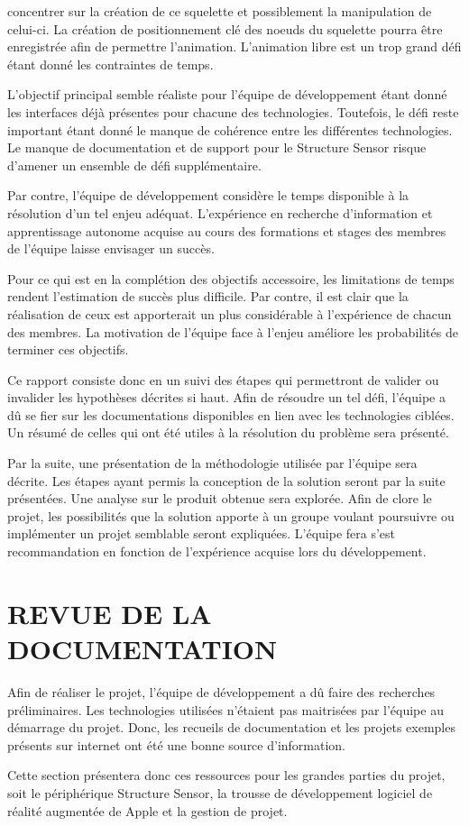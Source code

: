 \documentclass[letterpaper,twoside,12pt,french]{report}
\begin{document}
concentrer sur la création de ce squelette et possiblement la manipulation de celui-ci. La création
de positionnement clé des noeuds du squelette pourra être enregistrée afin de permettre l'animation.
L'animation libre est un trop grand défi étant donné les contraintes de temps.
\par
L'objectif principal semble réaliste pour l'équipe de développement étant donné les interfaces déjà
présentes pour chacune des technologies. Toutefois, le défi reste important étant donné le manque de
cohérence entre les différentes technologies. Le manque de documentation et de support pour le
Structure Sensor risque d'amener un ensemble de défi supplémentaire.
\par
Par contre, l'équipe de développement considère le temps disponible à la résolution d'un tel enjeu
adéquat. L'expérience en recherche d'information et apprentissage autonome acquise au cours des
formations et stages des membres de l'équipe laisse envisager un succès.
\par
Pour ce qui est en la complétion des objectifs accessoire, les limitations de temps rendent
l'estimation de succès plus difficile. Par contre, il est clair que la réalisation de ceux est
apporterait un plus considérable à l'expérience de chacun des membres. La motivation de l'équipe
face à l'enjeu améliore les probabilités de terminer ces objectifs.
\par
Ce rapport consiste donc en un suivi des étapes qui permettront de valider ou invalider les
hypothèses décrites si haut. Afin de résoudre un tel défi, l'équipe a dû se fier sur les
documentations disponibles en lien avec les technologies ciblées. Un résumé de celles qui ont été
utiles à la résolution du problème sera présenté.
\par
Par la suite, une présentation de la méthodologie utilisée par l'équipe sera décrite. Les étapes
ayant permis la conception de la solution seront par la suite présentées. Une analyse sur le produit
obtenue sera explorée. Afin de clore le projet, les possibilités que la solution apporte à un groupe voulant poursuivre ou
implémenter un projet semblable seront expliquées. L'équipe fera s'est recommandation en fonction
de l'expérience acquise lors du développement.
\chapter*{\uppercase{Revue de la documentation}}
Afin de réaliser le projet, l'équipe de développement a dû faire des recherches préliminaires. Les
technologies utilisées n'étaient pas maitrisées par l'équipe au démarrage du projet. Donc, les
recueils de documentation et les projets exemples présents sur internet ont été une bonne source
d'information.
\par
Cette section présentera donc ces ressources pour les grandes parties du projet,
soit le périphérique Structure Sensor, la trousse de développement logiciel de réalité augmentée de
Apple et la gestion de projet.
\end{document}
